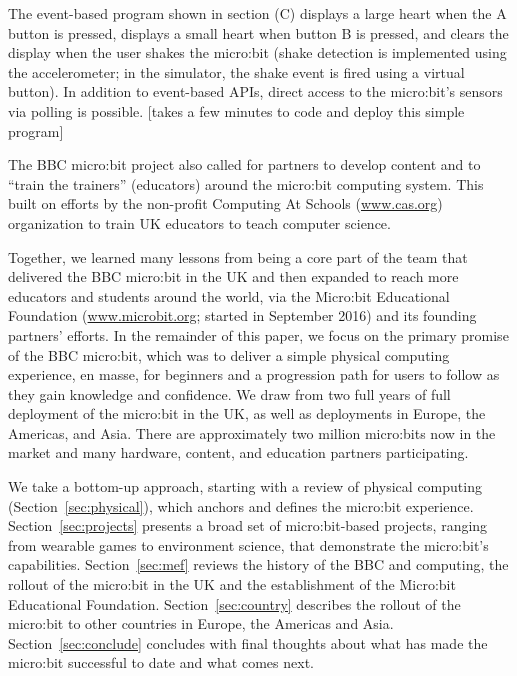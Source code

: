 The event-based program shown in section (C) displays a large heart when the
A button is pressed, displays a small heart when button B is pressed,
and clears the display when the user shakes the micro:bit (shake
detection is implemented using the accelerometer; in the simulator, the
shake event is fired using a virtual button). In addition to event-based
APIs, direct access to the micro:bit's sensors via polling is possible.
[takes a few minutes to code and deploy this simple program]

The BBC micro:bit project also called for partners to develop content
and to ``train the trainers'' (educators) around the micro:bit computing
system.  This built on efforts by the non-profit Computing At Schools
(\url{www.cas.org}) organization to train UK educators to teach computer
science. 




Together, we learned many lessons from being a core part of the team that
delivered the BBC micro:bit in the UK and then expanded to reach 
more educators and students around the world, via the Micro:bit Educational
Foundation (\url{www.microbit.org}; started in September 2016) and its 
founding partners' efforts.
In the remainder of this paper, we focus on the primary promise
of the BBC micro:bit, which was to deliver a simple physical computing
experience, en masse, for beginners and a progression path for users to follow
as they gain knowledge and confidence.  We draw from two full years of 
full deployment of the micro:bit in the UK, as well as deployments
in Europe, the Americas, and Asia.  There are approximately
two million micro:bits now in the market and many hardware,
content, and education partners participating. 

We take a bottom-up approach, starting with a review of
physical computing (Section~\ref{sec:physical}), which anchors 
and defines the micro:bit experience. Section~\ref{sec:projects}
presents a broad set of micro:bit-based projects, ranging
from wearable games to environment science, that demonstrate
the micro:bit's capabilities.  Section~\ref{sec:mef} reviews
the history of the BBC and computing, the rollout of the
micro:bit in the UK and the establishment of the Micro:bit
Educational Foundation.  Section~\ref{sec:country}
describes the rollout of the micro:bit to other countries
in Europe, the Americas and Asia. Section~\ref{sec:conclude}
concludes with final thoughts about what has made the micro:bit
successful to date and what comes next. 


